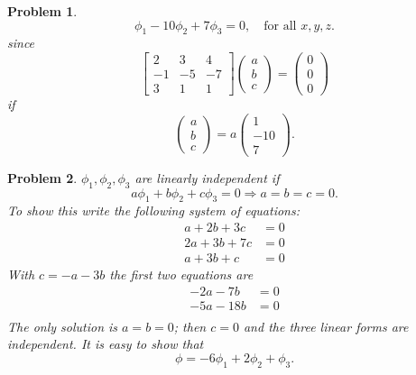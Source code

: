 \documentclass{article}
\theoremstyle{pprop}
\newtheorem{problem}{Problem}[section]
\begin{document}
\begin{problem}
$$
\phi_1 -10\phi_2+7\phi_3=0, \quad \text{for all $x,y,z$}
.$$
since 
$$
\begin{bmatrix}
2 & 3 & 4 \\ -1 & -5 &-7 \\ 3 & 1 & 1
\end{bmatrix}
\begin{pmatrix}
a \\ b \\ c
\end{pmatrix}=
\begin{pmatrix}
0 \\ 0 \\ 0
\end{pmatrix}
$$
if
$$
\begin{pmatrix}
a \\ b \\ c
\end{pmatrix}=a
\begin{pmatrix}
1 \\ -10 \\ 7
\end{pmatrix}.
$$  
\end{problem}
\begin{problem}
$\phi_1,\phi_2,\phi_3$ are linearly independent if 
$$
a\phi_1 + b \phi_2 + c \phi_3 = 0 \Rightarrow a=b=c=0.
$$
To show this write the following system of equations:
\begin{align*}
a+2b+3c &=0 \\
2a + 3b+7c &=0 \\
a+3b+c &=0
\end{align*}
With $c=-a-3b$ the first two equations are
\begin{align*}
-2a-7b &=0 \\
-5a -18b &=0 \\
\end{align*}
The only solution is $a=b=0$; then $c=0$ and the three linear forms are independent.
It is easy to show that 
$$
\phi=-6 \phi_1 +2 \phi_2+\phi_3.
$$  
\end{problem}
\end{document}
